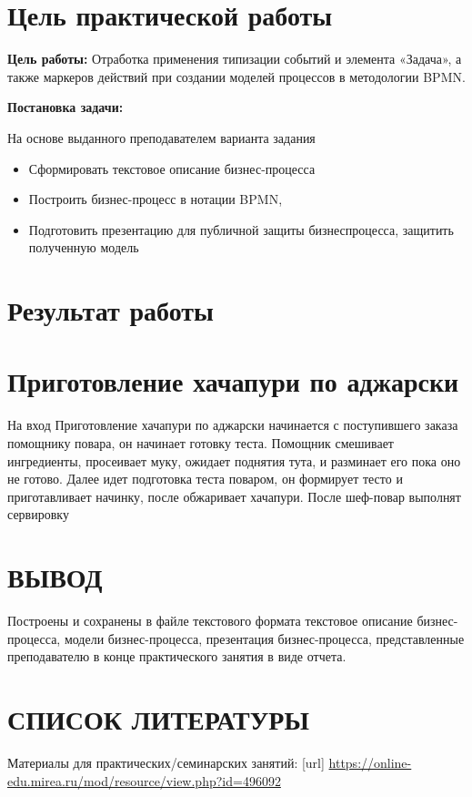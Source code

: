 
\section*{\LARGE Цель практической работы}

\textbf{Цель работы:} Отработка применения типизации событий и элемента
«Задача», а также маркеров действий при создании моделей процессов в
методологии BPMN.



\textbf{Постановка задачи:}\par
На основе выданного преподавателем варианта задания
\begin{itemize}
    \item Сформировать текстовое описание бизнес-процесса
    \item Построить бизнес-процесс в нотации BPMN,
    \item Подготовить презентацию для публичной защиты бизнеспроцесса, защитить полученную модель
\end{itemize}


\newpage

\section*{\LARGE Результат работы}

\section{Приготовление хачапури по аджарски}

На вход Приготовление хачапури по аджарски начинается с поступившего заказа помощнику повара, он начинает готовку теста.
Помощник смешивает ингредиенты, просеивает муку, ожидает поднятия тута, и разминает его пока оно не готово.
Далее идет подготовка теста поваром, он формирует тесто и приготавливает начинку, после обжаривает хачапури.
После шеф-повар выполнят сервировку


\newpage


\section*{ВЫВОД}
Построены и сохранены в
файле текстового формата текстовое описание бизнес-процесса, модели
бизнес-процесса, презентация бизнес-процесса, представленные
преподавателю в конце практического занятия в виде отчета.

\section*{СПИСОК ЛИТЕРАТУРЫ}
\begin{thebibliography}{}
    \bibitem{}  Материалы для практических/семинарских занятий: [url]
    \url{https://online-edu.mirea.ru/mod/resource/view.php?id=496092}
\end{thebibliography}
